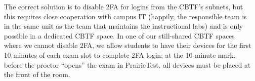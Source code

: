 The correct solution is to disable 2FA
for logins from the CBTF's subnets, but this requires
close cooperation with campus IT (happily, the responsible team
is in the same unit as the team that maintains the instructional labs)
and is only possible in a dedicated CBTF space.
In one of our still-shared CBTF
spaces where we cannot disable 2FA, we allow students to have their
devices for the first 10 minutes of each exam slot  to
complete 2FA login; at the 10-minute mark, before the proctor ``opens''
the exam in PrairieTest, all devices must be placed at the front of
the room.


